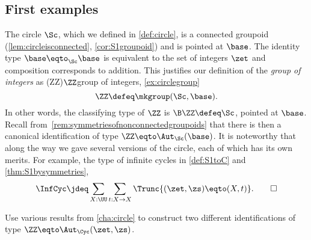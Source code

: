 \subsection{First examples}
\label{sec:firstgroupexamples}
\begin{example}\label{ex:circlegroup}
  The circle $\Sc$, which we defined in \cref{def:circle},
  is a connected groupoid (\cref{lem:circleisconnected}, \cref{cor:S1groupoid})
  and is pointed at $\base$.
  The identity type $\base\eqto_\Sc\base$ is equivalent to 
  the set of integers $\zet$ and composition corresponds to addition.
  This justifies our definition of the \emph{group of integers} as%
  \glossary(ZZ){$\protect\ZZ$}{group of integers,
      \cref{ex:circlegroup}}
  \[
    \ZZ \defeq \mkgroup(\Sc,\base).
  \]
  In other words, the classifying type of $\ZZ$ is $\B\ZZ \defeq \Sc$, 
  pointed at $\base$. 
  Recall from~\cref{rem:symmetriesofnonconnectedgroupoids} that there is 
  then a canonical identification of type $\ZZ \eqto \Aut_\Sc(\base)$.  
  It is noteworthy that along the way we gave several
  versions of the circle, each of which has its own merits.
  For example, the type of infinite cycles in \cref{def:S1toC}
  and \cref{thm:S1bysymmetries},
  \[
    \InfCyc\jdeq %
    \sum_{X:\UU} \sum_{t:X\to X} \Trunc{(\zet,\zs)\eqto(X,t)}.\qedhere
  \]
\end{example}
\begin{xca}\label{xca:groups}
Use various results from \cref{cha:circle} to construct two different
identifications of type $\ZZ \eqto \Aut_\Cyc(\zet,\zs)$.
\end{xca}

